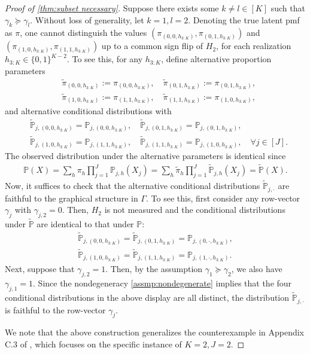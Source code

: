 \documentclass[10pt]{article} %
\newcommand{\PP}{\mathbb P}
\def\tilde{\widetilde}
\begin{document}
\begin{proof}[Proof of \cref{thm:subset necessary}]
    Suppose there exists some $k \neq l \in [K]$ such that $\gamma_k \succeq \gamma_l$. Without loss of generality, let $k=1, l=2$.
    Denoting the true latent pmf as $\pi$, one cannot distinguish the values $(\pi_{(0,0,h_{3:K})}, \pi_{(0,1,h_{3:K})})$ and $(\pi_{(1,0,h_{3:K})}, \pi_{(1,1,h_{3:K})})$ up to a common sign flip of $H_2$, for each realization $h_{3:K} \in \{0,1\}^{K-2}$. To see this, for any $h_{3:K}$, define alternative proportion parameters
    \begin{align*}
        &\tilde{\pi}_{(0,0,h_{3:K})} := \pi_{(0,0,h_{3:K})}, \quad \tilde{\pi}_{(0,1,h_{3:K})} := \pi_{(0,1,h_{3:K})}, \\
        &\tilde{\pi}_{(1,0,h_{3:K})} := \pi_{(1,1,h_{3:K})}, \quad \tilde{\pi}_{(1,1,h_{3:K})} := \pi_{(1,0,h_{3:K})},
    \end{align*}
    and alternative conditional distributions with
    \begin{align*}
        &\tilde{\PP}_{j,(0,0,h_{3:K})} = \PP_{j,(0,0,h_{3:K})}, \quad \tilde{\PP}_{j,(0,1,h_{3:K})} = \PP_{j,(0,1,h_{3:K})}, \\
        &\tilde{\PP}_{j,(1,0,h_{3:K})} = \PP_{j,(1,1,h_{3:K})}, \quad \tilde{\PP}_{j,(1,1,h_{3:K})} = \PP_{j,(1,0,h_{3:K})}, \quad \forall j \in [J].
    \end{align*}
    The observed distribution under the alternative parameters is identical since
    \begin{align*}
        \PP(X) = \sum_{h} \pi_h \prod_{j=1}^J \PP_{j,h} (X_j) = \sum_{h} \tilde{\pi}_h \prod_{j=1}^J \tilde{\PP}_{j,h} (X_j) = \tilde{\PP}(X).
    \end{align*}
    Now, it suffices to check that the alternative conditional distributions $\tilde{\PP}_{j,\cdot}$ are faithful to the graphical structure in $\Gamma$. To see this, first consider any row-vector $\gamma_j$ with $\gamma_{j,2} = 0$. Then, $H_2$ is not measured and the conditional distributions under $\tilde{\PP}$ are identical to that under $\PP$:
     \begin{align*}
        \tilde{\PP}_{j,(0,0,h_{3:K})} = \tilde{\PP}_{j,(0,1,h_{3:K})} = \PP_{j,(0,\cdot,h_{3:K})}, \\
        \tilde{\PP}_{j,(1,0,h_{3:K})} = \tilde{\PP}_{j,(1,1,h_{3:K})} = \PP_{j,(1,\cdot,h_{3:K})}.
    \end{align*}
    Next, suppose that $\gamma_{j,2} = 1$. Then, by the assumption $\gamma_1 \succeq \gamma_2$, we also have $\gamma_{j,1} = 1$. Since the nondegeneracy \cref{assmp:nondegenerate} implies that the four conditional distributions in the above display are all distinct, the distribution $\tilde{\PP}_{j,\cdot}$ is faithful to the row-vector $\gamma_j$.

    We note that the above construction generalizes the counterexample in Appendix C.3 of \cite{kivva2021learning}, which focuses on the specific instance of $K=2, J=2$.
\end{proof}
\end{document}
